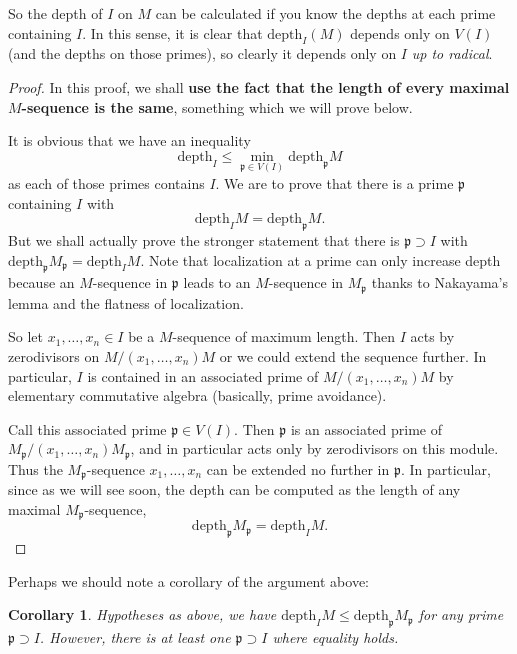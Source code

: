 \documentclass{article}
\newtheorem{corollary}{Corollary}
\begin{document}
So the depth of $I$ on $M$ can be calculated  if you know the depths at each
prime containing $I$. In this sense, it is clear that $\mathrm{depth}_I (M)$ depends
only on $V(I)$ (and the depths on those primes), so clearly it depends only on
$I$ \emph{up to radical}.

\begin{proof} 
In this proof, we shall \textbf{use the fact that the length of every maximal
$M$-sequence is the same}, something which we will prove below.

It is obvious that we have an inequality
\[ \mathrm{depth}_I \leq  \min_{\mathfrak{p} \in V(I)} \mathrm{depth}_{\mathfrak{p}} M \]
as each of those primes contains $I$. 
We are to prove that there is 
a prime $\mathfrak{p}$ containing $I$ with
\[ \mathrm{depth}_I M = \mathrm{depth}_{\mathfrak{p}} M . \]
But we shall actually prove the stronger statement that there is $\mathfrak{p}
\supset I$ with $\mathrm{depth}_{\mathfrak{p}} M_{\mathfrak{p}} = \mathrm{depth}_I M$. Note
that localization at a prime can only increase depth because an $M$-sequence in
$\mathfrak{p}$ leads to an $M$-sequence in $M_{\mathfrak{p}}$ thanks to
Nakayama's lemma and the flatness of localization.

So let $x_1, \dots, x_n \in I$ be a $M$-sequence of maximum length. Then $I$
acts by zerodivisors on 
$M/(x_1 , \dots, x_n) M$ or we could extend the sequence further. 
In particular, $I$ is contained in an associated prime of $M/(x_1, \dots, x_n)
M$ by elementary commutative algebra (basically, prime avoidance).

Call this associated prime $\mathfrak{p} \in V(I)$. Then $\mathfrak{p}$ is an
associated prime of $M_{\mathfrak{p}}/(x_1, \dots, x_n) M_{\mathfrak{p}}$,
and in particular acts only by zerodivisors on this module. 
Thus the $M_{\mathfrak{p}}$-sequence $x_1, \dots, x_n$ can be extended no
further in $\mathfrak{p}$. In particular, since as we will see soon, the depth
can be computed as the length of any maximal $M_{\mathfrak{p}}$-sequence,
\[ \mathrm{depth}_{\mathfrak{p}} M_{\mathfrak{p}} = \mathrm{depth}_I M. \]
\end{proof} 

Perhaps we should note a corollary of the argument above:
\begin{corollary} 
Hypotheses as above, we have $\mathrm{depth}_I M  \leq \mathrm{depth}_\mathfrak{p} M_{\mathfrak{p}}$ for
any prime $\mathfrak{p} \supset I$. However, there is at least one $\mathfrak{p}
\supset I$ where equality holds. \end{corollary}
\end{document}
